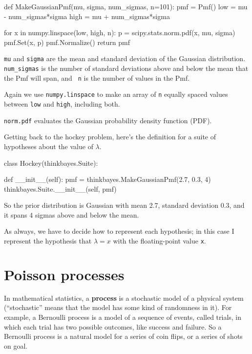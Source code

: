 \documentclass[12pt]{book}
\theoremstyle{exercise}
\begin{document}
\begin{code}
def MakeGaussianPmf(mu, sigma, num_sigmas, n=101):
    pmf = Pmf()
    low = mu - num_sigmas*sigma
    high = mu + num_sigmas*sigma

    for x in numpy.linspace(low, high, n):
        p = scipy.stats.norm.pdf(x, mu, sigma)
        pmf.Set(x, p)
    pmf.Normalize()
    return pmf
\end{code}  

{\tt mu} and {\tt sigma} are the mean and standard deviation of the
Gaussian distribution.  \verb"num_sigmas" is the number of standard
deviations above and below the mean that the Pmf will span, and {\tt
  n} is the number of values in the Pmf.

Again we use {\tt numpy.linspace} to make an array of {\tt n}
equally spaced values between {\tt low} and {\tt high}, including
both.

\verb"norm.pdf" evaluates the Gaussian probability density function (PDF).

Getting back to the hockey problem, here's the definition for a suite
of hypotheses about the value of $\lambda$.

\begin{code}
class Hockey(thinkbayes.Suite):

    def __init__(self):
        pmf = thinkbayes.MakeGaussianPmf(2.7, 0.3, 4)
        thinkbayes.Suite.__init__(self, pmf)
\end{code}  

So the prior distribution is Gaussian with mean 2.7, standard deviation
0.3, and it spans 4 sigmas above and below the mean.

As always, we have to decide how to represent each hypothesis; in
this case I represent the hypothesis that $\lambda=x$ with the
floating-point value {\tt x}. 


\section{Poisson processes}

In mathematical statistics, a {\bf process} is a stochastic model of a
physical system (``stochastic'' means that the model has some kind of
randomness in it).  For example, a Bernoulli process is a model of a
sequence of events, called trials, in which each trial has two
possible outcomes, like success and failure.  So a Bernoulli process
is a natural model for a series of coin flips, or a series of shots on
goal.   
\end{document}
